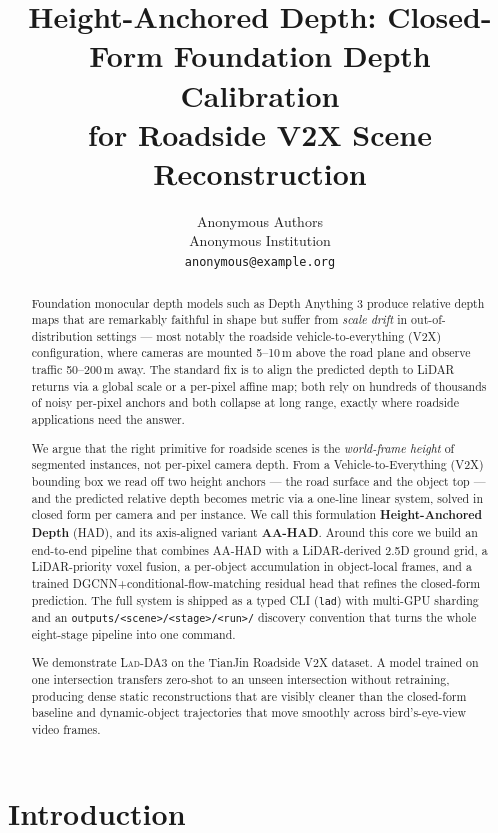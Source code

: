 \documentclass[10pt,twocolumn,letterpaper]{article}
\title{Height-Anchored Depth: Closed-Form Foundation Depth Calibration\\
for Roadside V2X Scene Reconstruction}
\author{Anonymous Authors\\
Anonymous Institution\\
{\tt\small anonymous@example.org}
}
\newcommand{\ourmethod}{\textsc{Lad-DA3}\xspace}
\begin{document}
\maketitle


\begin{abstract}
Foundation monocular depth models such as Depth Anything 3 produce
relative depth maps that are remarkably faithful in shape but suffer
from \emph{scale drift} in out-of-distribution settings — most notably
the roadside vehicle-to-everything (V2X) configuration, where cameras
are mounted 5–10\,m above the road plane and observe traffic 50–200\,m
away. The standard fix is to align the predicted depth to LiDAR returns
via a global scale or a per-pixel affine map; both rely on hundreds of
thousands of noisy per-pixel anchors and both collapse at long range,
exactly where roadside applications need the answer.

We argue that the right primitive for roadside scenes is the
\emph{world-frame height} of segmented instances, not per-pixel camera
depth. From a Vehicle-to-Everything (V2X) bounding box we read off two
height anchors — the road surface and the object top — and the
predicted relative depth becomes metric via a one-line linear system,
solved in closed form per camera and per instance. We call this formulation
\textbf{Height-Anchored Depth} (HAD), and its axis-aligned variant
\textbf{AA-HAD}. Around this core we build an end-to-end pipeline that
combines AA-HAD with a LiDAR-derived 2.5D ground grid, a LiDAR-priority
voxel fusion, a per-object accumulation in object-local frames, and a
trained DGCNN+conditional-flow-matching residual head that refines the
closed-form prediction. The full system is shipped as a typed CLI
(\texttt{lad}) with multi-GPU sharding and an
\texttt{outputs/<scene>/<stage>/<run>/} discovery convention that turns
the whole eight-stage pipeline into one command.

We demonstrate \ourmethod{} on the TianJin Roadside V2X dataset. A
model trained on one intersection transfers zero-shot to an unseen
intersection without retraining, producing dense static reconstructions
that are visibly cleaner than the closed-form baseline and dynamic-object
trajectories that move smoothly across bird's-eye-view video frames.
\end{abstract}


\section{Introduction}
\label{sec:intro}
\end{document}
